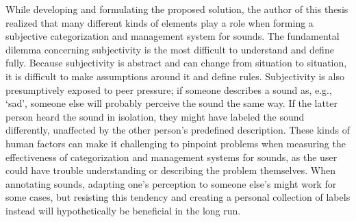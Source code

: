 While developing and formulating the proposed solution, the author of this thesis realized that many different kinds of elements play a role when forming a subjective categorization and management system for sounds. The fundamental dilemma concerning subjectivity is the most difficult to understand and define fully. Because subjectivity is abstract and can change from situation to situation, it is difficult to make assumptions around it and define rules. Subjectivity is also presumptively exposed to peer pressure; if someone describes a sound as, e.g., `sad', someone else will probably perceive the sound the same way. If the latter person heard the sound in isolation, they might have labeled the sound differently, unaffected by the other person's predefined description. These kinds of human factors can make it challenging to pinpoint problems when measuring the effectiveness of categorization and management systems for sounds, as the user could have trouble understanding or describing the problem themselves. When annotating sounds, adapting one's perception to someone else's might work for some cases, but resisting this tendency and creating a personal collection of labels instead will hypothetically be beneficial in the long run.

\egroup{}